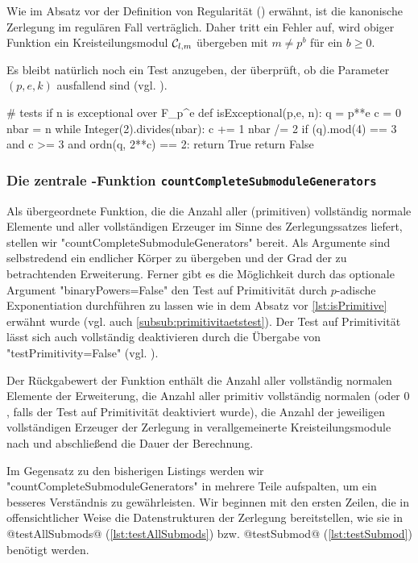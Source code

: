 Wie im Absatz vor der Definition von Regularität ()
erwähnt, ist die
kanonische Zerlegung im regulären Fall verträglich. Daher tritt ein Fehler auf,
wird obiger Funktion ein Kreisteilungsmodul $\mathcal{C}_{l,m}$ übergeben mit 
$m \neq p^b$ für ein $b\geq 0$.

Es bleibt natürlich noch ein Test anzugeben, der überprüft, ob 
die Parameter $(p,e,k)$ ausfallend sind (vgl. ).

\begin{sagecode}[caption={Aus \url{../Sage/enumeratePCNs.spyx}},
  firstnumber=452]
# tests if n is exceptional over F_p^e
def isExceptional(p,e, n):
    q = p**e
    c = 0
    nbar = n
    while Integer(2).divides(nbar):
        c += 1
        nbar /= 2
    if (q).mod(4) == 3  and c >= 3  and ordn(q, 2**c) == 2:
        return True
    return False
\end{sagecode}  


\subsubsection{Die zentrale \sage-Funktion 
  \texttt{countCompleteSubmoduleGenerators}}

Als übergeordnete Funktion, die die Anzahl aller (primitiven) vollständig
normale Elemente und aller vollständigen Erzeuger im Sinne des Zerlegungssatzes
liefert, stellen wir "countCompleteSubmoduleGenerators" bereit. Als Argumente
sind selbstredend ein endlicher Körper zu übergeben und der Grad der zu
betrachtenden Erweiterung. Ferner gibt es die Möglichkeit durch das optionale
Argument "binaryPowers=False" den Test auf Primitivität durch $p$-adische
Exponentiation durchführen zu lassen wie in dem Absatz vor 
\autoref{lst:isPrimitive} erwähnt wurde (vgl. auch 
\autoref{subsub:primitivitaetstest}). Der Test auf Primitivität lässt sich auch
vollständig deaktivieren durch die Übergabe von "testPrimitivity=False"
(vgl. ).

Der Rückgabewert der Funktion enthält die Anzahl aller vollständig normalen
Elemente der Erweiterung, die Anzahl aller primitiv vollständig normalen (oder
$0$, falls der Test auf Primitivität deaktiviert wurde), 
die Anzahl der jeweiligen vollständigen Erzeuger der Zerlegung in
verallgemeinerte Kreisteilungsmodule nach  und
abschließend die Dauer der Berechnung.

Im Gegensatz zu den bisherigen Listings werden wir
"countCompleteSubmoduleGenerators" in mehrere Teile aufspalten, um ein besseres
Verständnis zu gewährleisten. Wir beginnen mit den ersten Zeilen, die in
offensichtlicher Weise die Datenstrukturen der Zerlegung bereitstellen, wie sie
in @testAllSubmods@ (\autoref{lst:testAllSubmods}) bzw. @testSubmod@ 
(\autoref{lst:testSubmod}) benötigt werden.


